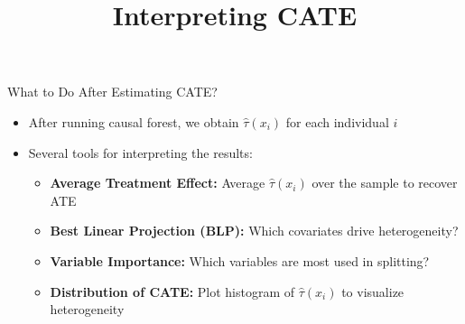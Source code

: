 \documentclass[hyperref={pdfpagelabels=false}]{beamer}
\begin{document}
\title[]
{Interpreting CATE}

\author{}
\institute{}
\date{}

\begin{frame}{}
	\titlepage
\end{frame}




\begin{frame}{What to Do After Estimating CATE?}
	\begin{itemize}
		\item After running causal forest, we obtain $\hat{\tau}(x_i)$ for each individual $i$
		\vspace{0.3cm}
		\item Several tools for interpreting the results:
		\vspace{0.2cm}
		\begin{itemize}
			\item[1] \textbf{Average Treatment Effect:} Average $\hat{\tau}(x_i)$ over the sample to recover ATE
			\vspace{0.2cm}
			\item[2] \textbf{Best Linear Projection (BLP):} Which covariates drive heterogeneity?
			\vspace{0.2cm}
			\item[3] \textbf{Variable Importance:} Which variables are most used in splitting?
			\vspace{0.2cm}
			\item[4] \textbf{Distribution of CATE:} Plot histogram of $\hat{\tau}(x_i)$ to visualize heterogeneity
		\end{itemize}
	\end{itemize}
\end{frame}
\end{document}
